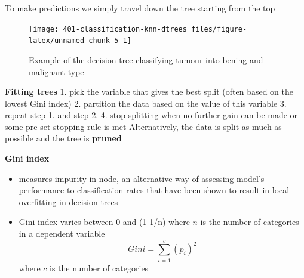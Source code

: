 \documentclass[
]{book}
\providecommand{\tightlist}{%
  \setlength{\itemsep}{0pt}\setlength{\parskip}{0pt}}
\theoremstyle{definition}
\theoremstyle{definition}
\theoremstyle{definition}
\theoremstyle{remark}
\begin{document}
To make predictions we simply travel down the tree starting from the top

\begin{figure}

{\centering \texttt{[image: 401-classification-knn-dtrees\_files/figure-latex/unnamed-chunk-5-1]} 

}

\caption{Example of the decision tree classifying tumour into bening and malignant type}\label{fig:unnamed-chunk-5}
\end{figure}

\textbf{Fitting trees}
1. pick the variable that gives the best split (often based on the lowest Gini index)
2. partition the data based on the value of this variable
3. repeat step 1. and step 2.
4. stop splitting when no further gain can be made or some pre-set stopping rule is met
Alternatively, the data is split as much as possible and the tree is \textbf{pruned}

\textbf{Gini index}

\begin{itemize}
\tightlist
\item
  measures impurity in node, an alternative way of assessing model's performance to classification rates that have been shown to result in local overfitting in decision trees
\item
  Gini index varies between 0 and (1-1/n) where \(n\) is the number of categories in a dependent variable
  \[Gini = \displaystyle \sum_{i=1}^{c}(p_i)^2\] where
  \(c\) is the number of categories
\end{itemize}
\end{document}

